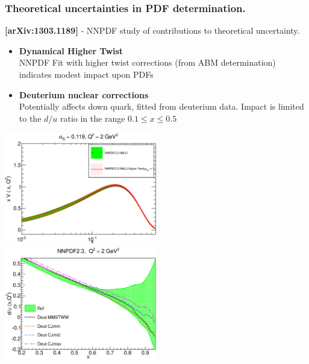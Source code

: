 \documentclass[10pt]{beamer}
\begin{document}
\begin{frame}
\frametitle{Theoretical uncertainties in PDF determination.}
\textbf{[arXiv:1303.1189]} - NNPDF study of contributions to theoretical uncertainty.\\

\begin{itemize}
\item<1-> \textbf{Dynamical Higher Twist}\\
\small NNPDF Fit with higher twist corrections (from ABM determination) indicates modest impact upon PDFs

\item<1-> \textbf{Deuterium nuclear corrections}\\
\small	Potentially affects down quark, fitted from deuterium data. Impact is limited to the $d/u$ ratio in the range $0.1 \le x \le 0.5 $


\end{itemize}

\includegraphics[width=0.5\textwidth]{xvalence-abs-nnpdf-nnpdf23-ref-vs-htp1-q2-2gev2.eps}
\includegraphics[width=0.5\textwidth]{d_over_u_deut.eps}

\end{frame}
\end{document}
